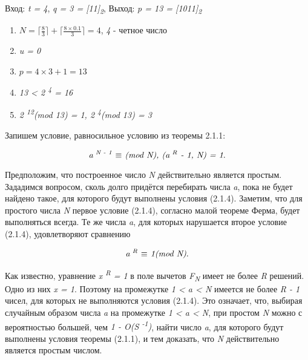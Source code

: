       \begin{example}
	Вход: \textit{t = 4}, \textit{q = 3 = [11]\textsubscript{2}}, Выход: \textit{p = 13 = [1011]\textsubscript{2}}
	
	  \begin{enumerate}
	   \item \textit{{$N = \lceil \frac{8}{3} \rceil + \lceil \frac{8 \times 0.1}{3} \rceil = 4$}}, \textit{4} - четное число
	   \item \textit{u = 0}
	   \item \textit{{$p = 4 \times 3 + 1 = 13$}}
	   \item \textit{13 < 2\textsuperscript{ 4} = 16}
	   \item \textit{2\textsuperscript{ 12}(mod 13) = 1, 2\textsuperscript{ 4}(mod 13) = 3}
	  \end{enumerate}  
	
      \end{example}

  Запишем условие, равносильное условию из теоремы 2.1.1:
  
    \begin{equation}
      \textit{a\textsuperscript{ N - 1} {$\equiv$} (mod N), (a\textsuperscript{ R} - 1, N) = 1}.
    \end{equation}
      
  Предположим, что построенное число \textit{N} действительно является простым. Зададимся вопросом, сколь долго придётся 
  перебирать числа \textit{a}, пока не будет найдено такое, для которого будут выполнены условия (2.1.4). Заметим, что для простого числа \textit{N}
  первое условие (2.1.4), согласно малой теореме Ферма, будет выполняться всегда. Те же числа \textit{a}, для которых нарушается второе 
  условие (2.1.4), удовлетворяют сравнению

  \begin{equation}
   \textit{a\textsuperscript{ R} {$\equiv$} 1(mod N)}.
  \end{equation}

  Как известно, уравнение \textit{x\textsuperscript{ R} = 1} в поле вычетов \textit{F\textsubscript{N}} имеет не более \textit{R} решений. 
  Одно из них \textit{x = 1}. Поэтому на промежутке \textit{1 < a < N} имеется не более \textit{R - 1} чисел, для которых не выполняются 
  условия (2.1.4). Это означает, что, выбирая случайным образом числа \textit{a} на промежутке \textit{1 < a < N}, при простом \textit{N}
  можно с вероятностью большей, чем \textit{1 - O(S\textsuperscript{ -1})}, найти число \textit{a}, для которого будут выполнены условия 
  теоремы (2.1.1), и тем доказать, что \textit{N} действительно является простым числом.

